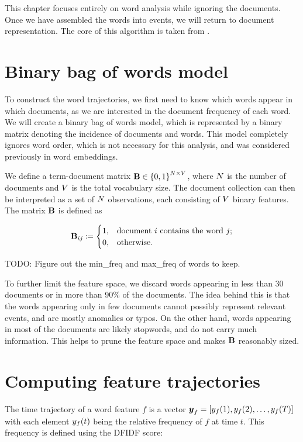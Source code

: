 This chapter focuses entirely on word analysis while ignoring the documents. Once we have assembled the words into events, we will return to document representation. The core of this algorithm is taken from \cite{event-detection}.


\section{Binary bag of words model}
To construct the word trajectories, we first need to know which words appear in which documents, as we are interested in the document frequency of each word. We will create a binary bag of words model, which is represented by a binary matrix denoting the incidence of documents and words. This model completely ignores word order, which is not necessary for this analysis, and was considered previously in word embeddings.

We define a term-document matrix $\mathbf{B} \in \left\{ 0, 1 \right\}^{N \times V}$, where $N$ is the number of documents and $V$ is the total vocabulary size. The document collection can then be interpreted as a set of $N$ observations, each consisting of $V$ binary features. The matrix $\mathbf{B}$ is defined as

\begin{equation} \label{eq:bow-matrix}
	\mathbf{B}_{ij} \coloneqq
	\begin{cases}
		1, & \text{document}~i~\text{contains the word}~j \text{;} \\
		0, & \text{otherwise.}
	\end{cases}
\end{equation}

{\color{red} TODO: Figure out the min\_freq and max\_freq of words to keep.}

To further limit the feature space, we discard words appearing in less than 30 documents or in more than 90\% of the documents. The idea behind this is that the words appearing only in few documents cannot possibly represent relevant events, and are mostly anomalies or typos. On the other hand, words appearing in most of the documents are likely stopwords, and do not carry much information. This helps to prune the feature space and makes $\mathbf{B}$ reasonably sized.


\section{Computing feature trajectories}
The time trajectory of a word feature $f$ is a vector $\vect{\traj}_{f} = \left[ \traj_{f}(1), \traj_{f}(2), \dots, \traj_{f}(\streamlen) \right]$ with each element $y_{f}(t)$ being the relative frequency of $f$ at time $t$. This frequency is defined using the DFIDF score:

